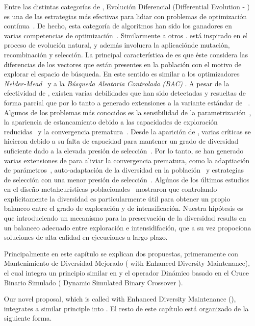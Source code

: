Entre las distintas categorías de \EAS{}, Evolución Diferencial (Differential Evolution - \DE{}) es una de las estrategias más efectivas para lidiar con problemas de optimización contínua~\cite{storn1997differential}.
%
De hecho, esta categoría de algoritmos han sido los ganadores en varias competencias de optimización~\cite{das2011differential}.
%
Similarmente a otros \EAS{}. \DE{} está inspirado en el proceso de evolución natural, y además involucra la aplicaciónde mutación, recombinación y selección.
%
La principal característica de \DE{} es que éste considera las diferencias de los vectores que están presentes en la población con el motivo de explorar el espacio de búsqueda.
%
En este sentido \DE{} es similar a los optimizadores \textit{Nelder-Mead}~\cite{nelder1965simplex}  y a la \textit{Búsqueda Aleatoria Controlada (BAC)} \cite{price1983global}.
%
A pesar de la efectividad de \DE{}, existen varias debilidades que han sido detectadas y resueltas de forma parcial que por lo tanto a generado extensiones a la variante estándar de \DE{}~\cite{das2011differential}.
%
Algunos de los problemas más conocidos es la sensibilidad de la parametrización~\cite{zhang2009jade}, la apariencia de estancamiento debido a las capacidades de exploración reducidas~\cite{sa2008exploration,lampinen2000stagnation} y la convergencia prematura~\cite{zaharie2003control}.
%
Desde la aparición de \DE{}, varias críticas se hicieron debido a su falta de capacidad para mantener un grado de diversidad suficiente dado a la elevada presión de selección~\cite{sa2008exploration}.
%
Por lo tanto, se han generado varias extensiones de \DE{} para aliviar la convergencia prematura, como la adaptiación de parámetros~\cite{zaharie2003control}, auto-adaptación de la diversidad en la población~\cite{yang2015differential} y estrategias de selección con una menor presión de selección~\cite{sa2008exploration}.
%
Algúnos de los últimos estudios en el diseño metaheurísticas poblacionales~\cite{Crepinsek:13} mostraron que controlando explícitamente la diversidad es particularmente útil para obtener un propio balanceo entre el grado de exploración y de intensificación.
%
Nuestra hipótesis es que introduciendo un mecanismo para la preservación de la diversidad results en un balanceo adecuado entre exploración e intensidifación, que a su vez propociona soluciones de alta calidad en ejecuciones a largo plazo.

Principalmente en este capítulo se explican dos propuestas, primeramente \DE{} con Mantenimiento de Diversidad Mejorado ( \DE with Enhanced Diversity Maintenance\DEEDM{}), el cual integra un principio similar en \DE{} y el operador Dinámico basado en el Cruce Binario Simulado ( Dynamic Simulated Binary Crossover \DSBX{}).

Our novel proposal, which is called \DE{} with Enhanced Diversity Maintenance (\DEEDM{}), integrates a similar principle into \DE{}.
%
El resto de este capítulo está organizado de la siguiente forma.
